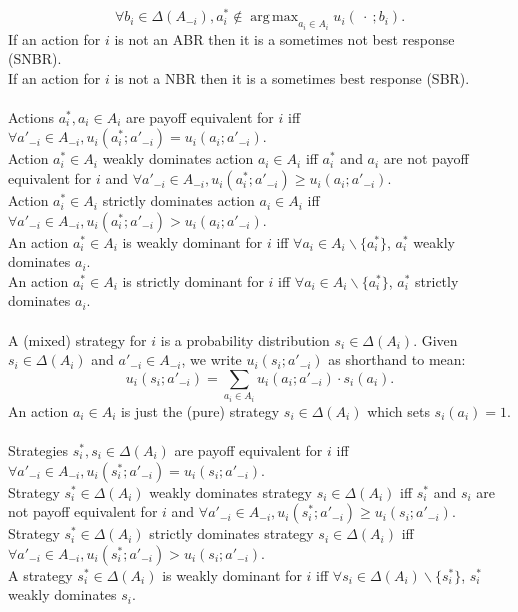 \documentclass[11pt]{article}
\DeclareMathOperator*{\argmax}{arg\,max}
\theoremstyle{definition}
\theoremstyle{plain}
\begin{document}
$$\forall b_i \in \Delta(A_{-i}), a^*_i \notin \argmax_{a_i \in A_i} u_i(\ \cdot\ ; b_i).$$
If an action for $i$ is not an ABR then it is a sometimes not best response (SNBR).
\\
If an action for $i$ is not a NBR then it is a sometimes best response (SBR).
\\
\\
Actions $a_i^*,a_i \in A_i$ are payoff equivalent for $i$ iff $\forall a'_{-i} \in A_{-i},  u_i(a^*_i;a'_{-i})=u_i(a_i;a'_{-i})$.  
\\
Action $a^*_i \in A_i$ weakly dominates action $a_i \in A_i$ iff $a^*_i$ and $a_i$ are not payoff equivalent for $i$ and  $\forall a'_{-i} \in A_{-i}, u_i(a^*_i;a'_{-i})\geq u_i(a_i;a'_{-i})$.  
\\
Action $a^*_i\in A_i$ strictly dominates action $a_i \in A_i$ iff $\forall a'_{-i} \in A_{-i}, u_i(a^*_i;a'_{-i})>u_i(a_i;a'_{-i}).$
\\
An action $a^*_i \in A_i$ is weakly dominant for $i$ iff $\forall a_i \in A_i \backslash\{a^*_i\}$, $a^*_i$ weakly dominates $a_i$.
\\
An action $a^*_i \in A_i$ is strictly dominant for $i$ iff $\forall a_i \in A_i \backslash \{a^*_i\}$, $a^*_i$ strictly dominates $a_i$.
\\
\\
A (mixed) strategy for $i$ is a probability distribution $s_i \in \Delta(A_i)$. Given $s_i \in \Delta(A_i)$ and $a'_{-i} \in A_{-i}$, we write $u_i(s_i;a'_{-i})$ as shorthand to mean:
$$u_i(s_i;a'_{-i})=\sum_{a_i \in A_i} u_i(a_i;a'_{-i}) \cdot s_i(a_i).$$
An action $a_i \in A_i$ is just the (pure) strategy $s_i \in \Delta(A_i)$ which sets $s_i(a_i)=1$.
\\
\\
Strategies $s_i^*,s_i \in \Delta(A_i)$ are payoff equivalent for $i$ iff $\forall a'_{-i} \in A_{-i},  u_i(s^*_i;a'_{-i})=u_i(s_i;a'_{-i})$.  
\\
Strategy $s^*_i \in \Delta(A_i)$ weakly dominates strategy $s_i \in \Delta(A_i)$ iff $s^*_i$ and $s_i$ are not payoff equivalent for $i$ and  $\forall a'_{-i} \in A_{-i}, u_i(s^*_i;a'_{-i})\geq u_i(s_i;a'_{-i})$.  
\\
Strategy $s^*_i\in \Delta(A_i)$ strictly dominates strategy $s_i \in \Delta(A_i)$ iff $\forall a'_{-i} \in A_{-i}, u_i(s^*_i;a'_{-i})>u_i(s_i;a'_{-i}).$
\\
A strategy $s^*_i \in \Delta(A_i)$ is weakly dominant for $i$ iff $\forall s_i \in \Delta(A_i) \backslash\{s^*_i\}$, $s^*_i$ weakly dominates $s_i$.
\end{document}
